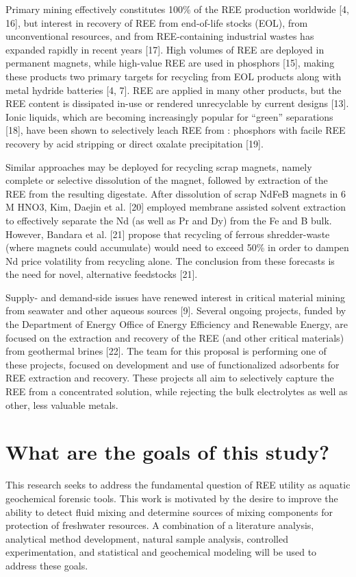 Primary mining effectively constitutes 100\% of the REE production worldwide [4, 16],
but interest in recovery of REE from end-of-life stocks (EOL), from unconventional resources, and from REE-containing industrial wastes has expanded rapidly in recent years [17].
High volumes of REE are deployed in permanent magnets, while high-value REE are used in phosphors [15],
making these products two primary targets for recycling from EOL products along with metal hydride batteries [4, 7].
REE are applied in many other products, but the REE content is dissipated in-use or rendered unrecyclable by current designs [13].
Ionic liquids, which are becoming increasingly popular for ``green'' separations [18],
have been shown to selectively leach REE from : phosphors with facile REE recovery by acid stripping or direct oxalate precipitation [19].

Similar approaches may be deployed for recycling scrap magnets, namely complete or selective dissolution of the magnet, followed by extraction of the REE from the resulting digestate. After dissolution of scrap NdFeB magnets in 6 M HNO3, Kim, Daejin et al. [20] employed membrane assisted solvent extraction to effectively separate the Nd (as well as Pr and Dy) from the Fe and B bulk. However, Bandara et al. [21] propose that recycling of ferrous shredder-waste (where magnets could accumulate) would need to exceed 50\% in order to dampen Nd price volatility from recycling alone. The conclusion from these forecasts is the need for novel, alternative feedstocks [21].

Supply- and demand-side issues have renewed interest in critical material mining from seawater and other aqueous sources [9].
Several ongoing projects, funded by the Department of Energy Office of Energy Efficiency and Renewable Energy, are focused on the extraction and recovery of the REE (and other critical materials) from geothermal brines [22].
The team for this proposal is performing one of these projects, focused on development and use of functionalized adsorbents for REE extraction and recovery. These projects all aim to selectively capture the REE from a concentrated solution, while rejecting the bulk electrolytes as well as other, less valuable metals.

\section{What are the goals of this study?}
This research seeks to address the fundamental question of REE utility as aquatic geochemical forensic tools.
This work is motivated by the desire to improve the ability to detect fluid mixing and determine sources of mixing components for protection of freshwater resources.
A combination of a literature analysis, analytical method development, natural sample analysis, controlled experimentation, and statistical and geochemical modeling will be used to address these goals.

